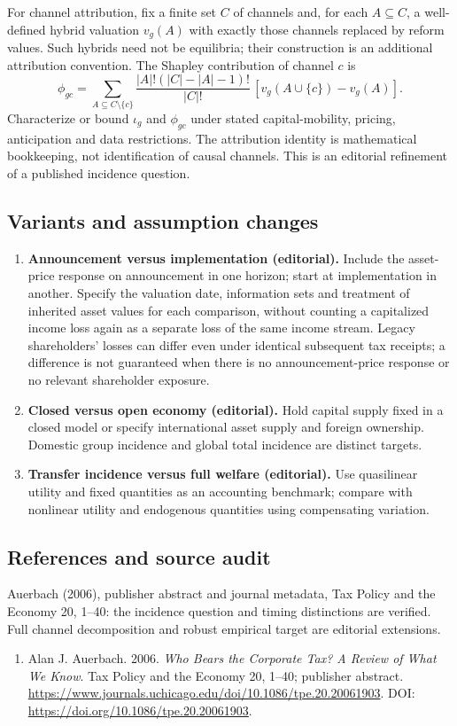 \documentclass[11pt,a4paper]{article}
\begin{document}
For channel attribution, fix a finite set \(C\) of channels and, for each \(A\subseteq C\), a well-defined hybrid valuation \(v_g(A)\) with exactly those channels replaced by reform values. Such hybrids need not be equilibria; their construction is an additional attribution convention. The Shapley contribution of channel \(c\) is
\[
 \phi_{gc}=\sum_{A\subseteq C\setminus\{c\}}
 \frac{|A|!(|C|-|A|-1)!}{|C|!}\,[v_g(A\cup\{c\})-v_g(A)].
\]
Characterize or bound \(\iota_g\) and \(\phi_{gc}\) under stated capital-mobility, pricing, anticipation and data restrictions. The attribution identity is mathematical bookkeeping, not identification of causal channels. This is an editorial refinement of a published incidence question.
\subsection*{Variants and assumption changes}
\begin{enumerate}
\item \textbf{Announcement versus implementation (editorial).} Include the asset-price response on announcement in one horizon; start at implementation in another. Specify the valuation date, information sets and treatment of inherited asset values for each comparison, without counting a capitalized income loss again as a separate loss of the same income stream. Legacy shareholders' losses can differ even under identical subsequent tax receipts; a difference is not guaranteed when there is no announcement-price response or no relevant shareholder exposure.
\item \textbf{Closed versus open economy (editorial).} Hold capital supply fixed in a closed model or specify international asset supply and foreign ownership. Domestic group incidence and global total incidence are distinct targets.
\item \textbf{Transfer incidence versus full welfare (editorial).} Use quasilinear utility and fixed quantities as an accounting benchmark; compare with nonlinear utility and endogenous quantities using compensating variation.
\end{enumerate}
\subsection*{References and source audit}
Auerbach (2006), publisher abstract and journal metadata, Tax Policy and the Economy 20, 1--40: the incidence question and timing distinctions are verified. Full channel decomposition and robust empirical target are editorial extensions.
\begin{enumerate}\raggedright
\item\hypertarget{definitions:source:30007756:1}{} Alan J. Auerbach. 2006. \emph{Who Bears the Corporate Tax? A Review of What We Know}. Tax Policy and the Economy 20, 1–40; publisher abstract.
\url{https://www.journals.uchicago.edu/doi/10.1086/tpe.20.20061903}.
DOI: \url{https://doi.org/10.1086/tpe.20.20061903}.
\end{enumerate}
\end{document}
